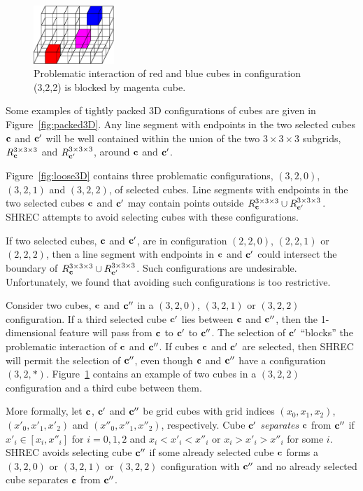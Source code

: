\begin{figure}[t]
\centering

\includegraphics[width=1.2in]{images/config3D_3_2_2_B.eps}

\caption{Problematic interaction of red and blue cubes
in configuration (3,2,2) is blocked by magenta cube.}
\label{fig:blocked3D}
\end{figure}

Some examples of tightly packed 3D configurations of cubes are given
in Figure~\ref{fig:packed3D}.
Any line segment with endpoints in the two selected cubes $\mathbf{c}$ and $\mathbf{c}'$
will be well contained within the union 
of the two $3 \times 3 \times 3$ subgrids, 
$R^{3 \times 3 \times 3}_{\mathbf{c}}$ and $R^{3 \times 3 \times 3}_{\mathbf{c}'}$, around $\mathbf{c}$ and $\mathbf{c}'$.

Figure~\ref{fig:loose3D} contains three problematic configurations,
$(3,2,0)$, $(3,2,1)$ and $(3,2,2)$,
of  selected cubes.
Line segments with endpoints in the two selected cubes $\mathbf{c}$ and $\mathbf{c}'$
may contain points outside $R^{3 \times 3 \times 3}_{\mathbf{c}} \cup R^{3 \times 3 \times 3}_{\mathbf{c}'}$.
SHREC attempts to avoid selecting cubes with these configurations.

If two selected cubes, $\mathbf{c}$ and $\mathbf{c}'$, 
are in configuration $(2,2,0)$, $(2,2,1)$ or $(2,2,2)$,
then a line segment with endpoints in $\mathbf{c}$ and $\mathbf{c}'$
could intersect the boundary of $R^{3 \times 3 \times 3}_{\mathbf{c}} \cup R^{3 \times 3 \times 3}_{\mathbf{c}'}$.
Such configurations are undesirable.
Unfortunately, we found that avoiding such configurations is too restrictive.

Consider two cubes, $\mathbf{c}$ and $\mathbf{c}''$ 
in a $(3,2,0)$, $(3,2,1)$ or $(3,2,2)$ configuration.
If a third selected cube $\mathbf{c}'$ lies between $\mathbf{c}$ and $\mathbf{c}''$,
then the 1-dimensional feature will pass from $\mathbf{c}$ to $\mathbf{c}'$ to $\mathbf{c}''$.
The selection of $\mathbf{c}'$ ``blocks'' the problematic interaction 
of $\mathbf{c}$ and $\mathbf{c}''$.
If cubes $\mathbf{c}$ and $\mathbf{c}'$ are selected,
then SHREC will permit the selection of $\mathbf{c}''$,
even though $\mathbf{c}$ and $\mathbf{c}''$ have a configuration $(3,2,*)$.
Figure~\ref{fig:blocked3D} contains an example of two cubes 
in a $(3,2,2)$ configuration and a third cube between them.

More formally,
let $\mathbf{c}$, $\mathbf{c}'$ and $\mathbf{c}''$ be grid cubes with grid indices
$(x_0,x_1,x_2)$, $(x'_0,x'_1,x'_2)$ and $(x''_0,x''_1,x''_2)$, respectively.
Cube $\mathbf{c}'$ {\em separates} $\mathbf{c}$ from $\mathbf{c}''$
if $x'_i \in [x_i,x''_i]$ for $i = 0,1,2$
and $x_i < x'_i < x''_i$ or $x_i > x'_i > x''_i$ for some $i$.
SHREC avoids selecting cube $\mathbf{c}''$ if some already selected cube $\mathbf{c}$
forms a $(3,2,0)$ or $(3,2,1)$ or $(3,2,2)$ configuration with $\mathbf{c}''$
and no already selected cube separates $\mathbf{c}$ from $\mathbf{c}''$.

